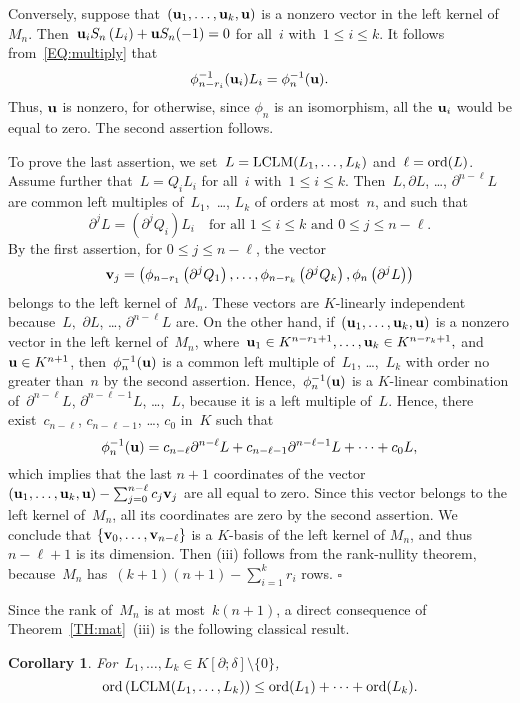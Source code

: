 \documentclass{sig-alt-full}
\def\foorp{\hfill$\square$}
\newcommand{\pa} { \partial}
\newcommand{\vu} { {\bf u}}
\newcommand{\vv}{ {\bf v}}
\newcommand{\ord} { {\rm ord}}
\newcommand{\lclm} { {\rm LCLM}}
\newtheorem{cor}[theorem]{Corollary}
\begin{document}
Conversely, suppose that~$(\vu_1, \ldots, \vu_k, \vu)$ is a nonzero vector in the left kernel of~$M_n$.
Then~$\vu_i S_n\left( L_i \right) + \vu S_n(-1)=0$ for all~$i$ with~$1 \le i \le k$.
It follows from~\eqref{EQ:multiply} that
$$\phi_{n-r_i}^{-1}(\vu_i) L_i = \phi_n^{-1}(\vu).$$
Thus, $\vu$ is nonzero, for otherwise, since $\phi_n$ is an isomorphism, all the $\vu_i$ would be equal to zero.
The second assertion follows.

To prove the last assertion, we set~$L=\lclm(L_1, \ldots, L_k)$ and~$\ell=\ord(L)$.
Assume further that~$L=Q_i L_i$ for all~$i$ with~$1 \le i \le k$.
Then~$L, \pa L$, \ldots, $\pa^{n-\ell} L$ are common left  multiples of~$L_1,$ \ldots, $L_k$ of orders at most~$n$, and such that
\[  \pa^j L = \left(\pa^j Q_i \right) L_i \quad
\mbox{for all $1 \le i \le k$ and~$0 \le j \le n-\ell$.} \]
By the first assertion, for $0 \leq j \leq n-\ell$, the vector
\[ \vv_j = \left(\phi_{n-r_1}\left( \pa^j Q_1 \right), \ldots, \phi_{n-r_k} \left(\pa^j Q_k \right),
\phi_n\left(\pa^{j} L\right)\right) \]
belongs to the left kernel of~$M_n$. These vectors are $K$-linearly independent because~$L,$ $\pa L$, \ldots, $\pa^{n-\ell} L$
are. 
On the other hand, if~$(\vu_1, \ldots, \vu_k, \vu)$ is a nonzero vector in the left kernel of~$M_n$,
where~$\vu_1 \in K^{n-r_1+1}, \ldots, \vu_k \in K^{n-r_k+1},$ and~$\vu \in K^{n+1}$, then~$\phi_n^{-1}(\vu)$ is
a common left multiple of~$L_1$, \ldots,~$L_k$ with order no greater than~$n$ by the second assertion.
Hence,~$\phi_n^{-1}(\vu)$ is a $K$-linear combination of~$\pa^{n-\ell}L$, $\pa^{n-\ell-1} L$, \ldots,~$L$,
because it is a left multiple of~$L$.
Hence, there exist~$c_{n-\ell}$, $c_{n-\ell-1}$, \ldots, $c_0$ in~$K$ such
that
$$\phi_n^{-1}(\vu) =c_{n-\ell} \pa^{n-\ell} L + c_{n-\ell-1} \pa^{n-\ell-1} L + \cdots + c_0 L,$$
which implies that the last $n+1$ coordinates of the vector
$(\vu_1, \ldots, \vu_k, \vu)-\sum_{j=0}^{n-\ell}c_j \vv_j$
are all equal to zero. Since this vector belongs to
the left kernel of~$M_n$, all its coordinates are zero by the second assertion.
We conclude that $\{  \vv_0,\ldots,  \vv_{n-\ell}\}$ is a $K$-basis of the left kernel of $M_n$, and thus~$n-\ell+1$ is its dimension. Then (iii) follows from the rank-nullity theorem, because~$M_n$
has~$(k+1)(n+1)- \sum_{i=1}^k r_i$ rows.
\foorp

\medskip
Since the rank of~$M_n$ is at most~$k(n+1)$, a direct consequence of Theorem~\ref{TH:mat}~(iii) is the following classical result.
\begin{cor} \label{COR:bounds} 
For~$L_1, \ldots, L_k \in K[\pa; \delta] \setminus \{0\}$,
\[ \ord \left( \lclm(L_1, \ldots, L_k) \right) \le \ord(L_1) + \cdots + \ord(L_k). \]
\end{cor}
\end{document}
